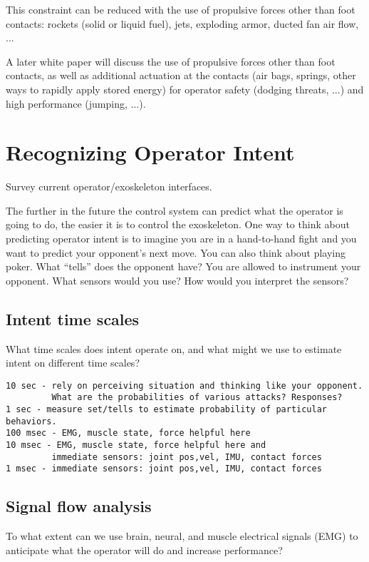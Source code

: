 \documentclass[letterpaper,12pt,fullpage]{article}
\begin{document}
This constraint can be reduced with the use of propulsive forces other
than foot contacts: rockets (solid or liquid fuel), jets, exploding armor,
ducted fan air flow, ...

A later white paper will discuss the use of propulsive forces other
than foot contacts, as well as additional actuation at the contacts (air
bags, springs, other ways to rapidly apply stored energy) for
operator safety (dodging threats, ...) and high performance (jumping, ...).

\section{Recognizing Operator Intent}

Survey current operator/exoskeleton interfaces.

The further in the future the control system can predict what the operator
is going to do, the easier it is to control the exoskeleton. One way
to think about predicting operator intent is to imagine you are in
a hand-to-hand fight and you want to predict your opponent's next move.
You can also think about playing poker. What ``tells'' does the opponent
have?
You are allowed to instrument your opponent. What sensors would you use?
How would you interpret the sensors?

\subsection{Intent time scales}

What time scales does intent operate on, and what might we use
to estimate intent on different time scales?

\begin{verbatim}
10 sec - rely on perceiving situation and thinking like your opponent.
         What are the probabilities of various attacks? Responses?
1 sec - measure set/tells to estimate probability of particular behaviors.
100 msec - EMG, muscle state, force helpful here
10 msec - EMG, muscle state, force helpful here and
         immediate sensors: joint pos,vel, IMU, contact forces
1 msec - immediate sensors: joint pos,vel, IMU, contact forces
\end{verbatim}

\subsection{Signal flow analysis}

To what extent can we use brain, neural, and muscle electrical signals
(EMG) to anticipate what the operator will do and increase performance?
\end{document}
